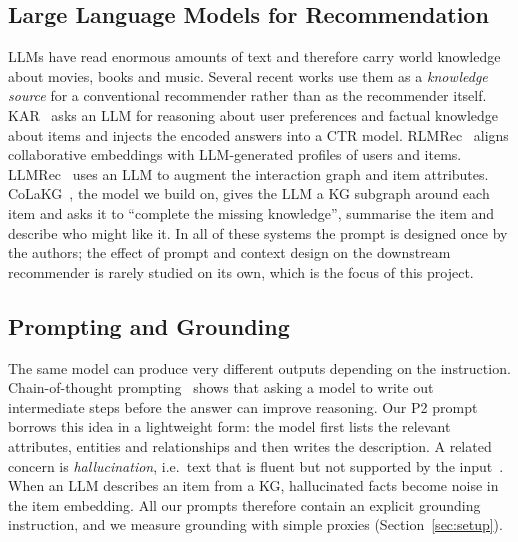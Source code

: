 \documentclass[a4paper,11pt]{article}
\begin{document}
\subsection{Large Language Models for Recommendation}
LLMs have read enormous amounts of text and therefore carry world knowledge about movies, books and music. Several recent works use them as a \emph{knowledge source} for a conventional recommender rather than as the recommender itself. KAR~\cite{xi2024kar} asks an LLM for reasoning about user preferences and factual knowledge about items and injects the encoded answers into a CTR model. RLMRec~\cite{ren2024rlmrec} aligns collaborative embeddings with LLM-generated profiles of users and items. LLMRec~\cite{wei2024llmrec} uses an LLM to augment the interaction graph and item attributes. CoLaKG~\cite{cui2025colakg}, the model we build on, gives the LLM a KG subgraph around each item and asks it to ``complete the missing knowledge'', summarise the item and describe who might like it. In all of these systems the prompt is designed once by the authors; the effect of prompt and context design on the downstream recommender is rarely studied on its own, which is the focus of this project.

\subsection{Prompting and Grounding}
The same model can produce very different outputs depending on the instruction. Chain-of-thought prompting~\cite{wei2022cot} shows that asking a model to write out intermediate steps before the answer can improve reasoning. Our P2 prompt borrows this idea in a lightweight form: the model first lists the relevant attributes, entities and relationships and then writes the description. A related concern is \emph{hallucination}, i.e.\ text that is fluent but not supported by the input~\cite{ji2023hallucination}. When an LLM describes an item from a KG, hallucinated facts become noise in the item embedding. All our prompts therefore contain an explicit grounding instruction, and we measure grounding with simple proxies (Section~\ref{sec:setup}).
\end{document}
